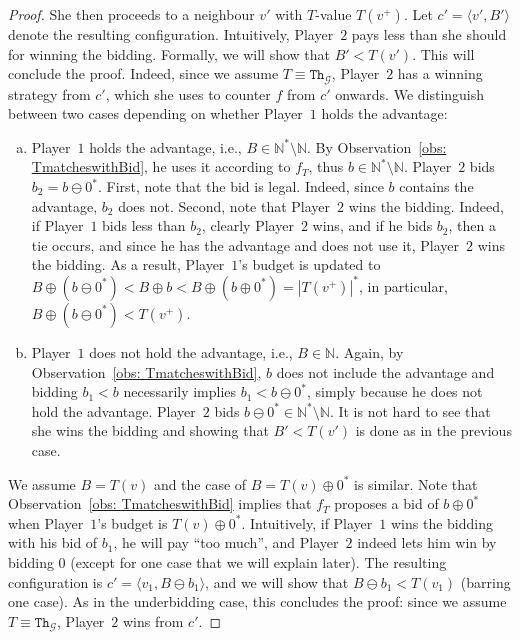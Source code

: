 \documentclass{theoretics}
\newcommand{\PO}{Player~$1$\xspace}
\newcommand{\PT}{Player~$2$\xspace}
\newcommand{\G}{{\mathcal G}}
\newcommand{\Nat}{\mathbb{N}}
\newcommand{\Natstro}{\mathbb{N}^* \setminus \mathbb{N}}
\newcommand{\thresh}{\texttt{Th}\xspace}
\newcommand{\zug}[1]{\langle #1  \rangle}
\newcommand{\succb}[1]{#1 \oplus 0^*\xspace}
\begin{document}
\begin{proof}
She then proceeds to a neighbour $v'$ with \(T\)-value \(T(v^+)\). Let $c' = \zug{v', B'}$ denote the resulting configuration. Intuitively, \PT pays less than she should for winning the bidding. Formally, we will show that $B' < T(v')$. This will conclude the proof. Indeed, since we assume $T \equiv \thresh_\G$, \PT has a winning strategy from $c'$, which she uses to counter $f$ from \(c'\) onwards. 
We distinguish between two cases depending on whether \PO holds the advantage:
\begin{enumerate}[(a)]
	\item \PO holds the advantage, i.e., \(B \in \Natstro\). By Observation~\ref{obs: TmatcheswithBid}, he uses it according to \(f_T\), thus \(b \in \Natstro\). 
	\PT bids $b_2 = b \ominus 0^*$. 
	First, note that the bid is legal. Indeed, since $b$ contains the advantage, $b_2$ does not. 
	Second, note that \PT wins the bidding. 
	Indeed, if \PO bids less than $b_2$, clearly \PT wins, and if he bids $b_2$, then a tie occurs, and since he has the advantage and does not use it, \PT wins the bidding. 
	As a result, \PO's budget is updated to \(B \oplus (b \ominus 0^*) < B \oplus b < B \oplus (\succb{b}) = |T(v^+)|^*\), in particular, \(B \oplus (b \ominus 0^*) < T(v^+)\). 
	
	\item \PO does not hold the advantage, i.e., \(B \in \Nat\). Again, by Observation~\ref{obs: TmatcheswithBid}, $b$ does not include the advantage and bidding \(b_1 < b\) necessarily implies \(b_1 < b \ominus 0^*\), simply because he does not hold the advantage. 
 \PT bids \(b \ominus 0^* \in \Natstro\). It is not hard to see that she wins the bidding and showing that $B' < T(v')$ is done as in the previous case. 
\end{enumerate}


We assume \(B = T(v)\) and the case of \(B = \succb{T(v)}\) is similar. Note that Observation~\ref{obs: TmatcheswithBid} implies that $f_T$ proposes a bid of \(\succb{b}\) when \PO's budget is \(\succb{T(v)}\). 
Intuitively, if \PO wins the bidding with his bid of $b_1$, he will pay ``too much'', and \PT indeed lets him win by bidding $0$ (except for one case that we will explain later). 
The resulting configuration is \(c' = \zug{v_1, B \ominus b_1}\), and we will show that \(B \ominus b_1 < T(v_1)\) (barring one case). As in the underbidding  case, this concludes the proof: since we assume $T \equiv \thresh_\G$, \PT wins from $c'$. 


\end{proof}
\end{document}
